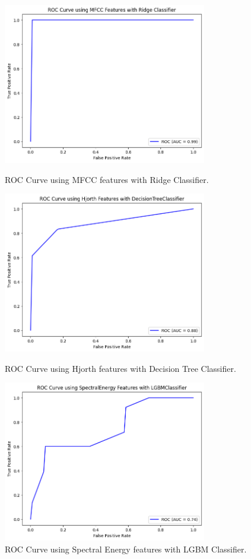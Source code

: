 \documentclass[applsci,article,accept,moreauthors,pdftex]{Definitions/mdpi}
\begin{document}
\begin{figure}[H]
    \centering
    \includegraphics[width=3.5in]{figures/RidgeFull.png}
    \caption{ROC Curve using MFCC features with Ridge Classifier.}
    \label{fig:imgmfcc}
\vspace{0.3cm}
    \includegraphics[width=3.5in]{figures/DesFull.png}
    \caption{ROC Curve using Hjorth features with Decision Tree Classifier.}
    \label{fig:imghjorth}
\vspace{0.3cm}
    \includegraphics[width=3.5in]{figures/LGBMFull.png}
    \caption{ROC Curve using Spectral Energy features with LGBM Classifier.}
    \label{fig:imgspectr}
\end{figure}
\end{document}
